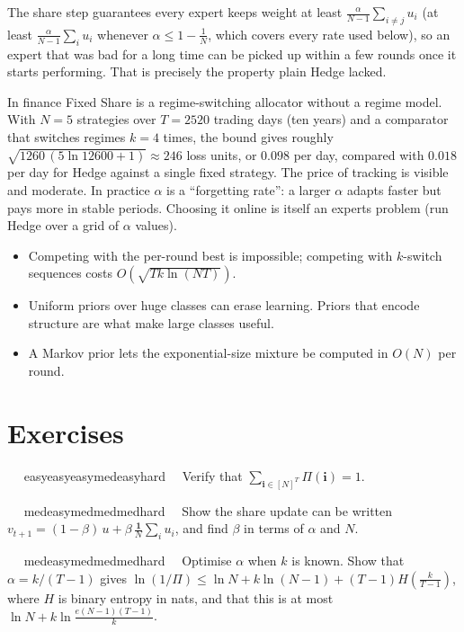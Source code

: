 \documentclass[11pt,a4paper,openany]{book}
\newcommand{\extag}[2]{%
  \def\tmp{#1}\def\tmpE{easy}\def\tmpM{med}\def\tmpH{hard}%
  \ifx\tmp\tmpE\def\tagc{defc}\else\ifx\tmp\tmpM\def\tagc{thmc}\else\ifx\tmp\tmpH\def\tagc{warnc}\else\def\tagc{finc}\fi\fi\fi
  \tcbox[on line,boxrule=0pt,arc=2pt,colback=\tagc!12,left=2pt,right=2pt,top=0pt,bottom=0pt,boxsep=1pt]{\sffamily\scriptsize\bfseries\color{\tagc}#2}}
\newcommand{\exercise}[3]{\par\medskip\noindent\textbf{\sffamily #1}\ \ #2\ \ #3\par}
\begin{document}
The share step guarantees every expert keeps weight at least $\frac{\alpha}{N-1}\sum_{i\ne j}u_i$ (at least $\frac{\alpha}{N-1}\sum_iu_i$ whenever $\alpha\le1-\frac1N$, which covers every rate used below), so an expert that was bad for a long time can be picked up within a few rounds once it starts performing. That is precisely the property plain Hedge lacked.

\begin{bfin}{In finance}
Fixed Share is a regime-switching allocator without a regime model. With $N=5$ strategies over $T=2520$ trading days (ten years) and a comparator that switches regimes $k=4$ times, the bound gives roughly $\sqrt{1260\,(5\ln 12600+1)}\approx 246$ loss units, or $0.098$ per day, compared with $0.018$ per day for Hedge against a single fixed strategy. The price of tracking is visible and moderate. In practice $\alpha$ is a ``forgetting rate'': a larger $\alpha$ adapts faster but pays more in stable periods. Choosing it online is itself an experts problem (run Hedge over a grid of $\alpha$ values).
\end{bfin}

\begin{takeaways}
\begin{itemize}
\item Competing with the per-round best is impossible; competing with $k$-switch sequences costs $O(\sqrt{Tk\ln(NT)})$.
\item Uniform priors over huge classes can erase learning. Priors that encode structure are what make large classes useful.
\item A Markov prior lets the exponential-size mixture be computed in $O(N)$ per round.
\end{itemize}
\end{takeaways}

\section*{Exercises}\label{ch4-ex}

\exercise{4.1}{\extag{easy}{warm-up}}{\hypertarget{sol-4.1}{}Verify that $\sum_{\mathbf i\in[N]^T}\Pi(\mathbf i)=1$.}

\exercise{4.2}{\extag{med}{core}}{\hypertarget{sol-4.2}{}Show the share update can be written $v_{t+1}=(1-\beta)\,u+\beta\,\frac{\mathbf 1}{N}\sum_iu_i$, and find $\beta$ in terms of $\alpha$ and $N$.}

\exercise{4.3}{\extag{med}{core}}{\hypertarget{sol-4.3}{}Optimise $\alpha$ when $k$ is known. Show that $\alpha=k/(T-1)$ gives $\ln(1/\Pi)\le\ln N+k\ln(N-1)+(T-1)H(\tfrac{k}{T-1})$, where $H$ is binary entropy in nats, and that this is at most $\ln N+k\ln\frac{e(N-1)(T-1)}{k}$.}
\end{document}
